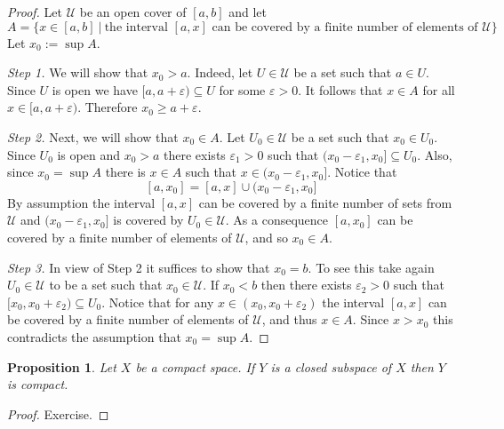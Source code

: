 \documentclass[11pt, letterpaper, oneside]{report}
\theoremstyle{pplain}
\newtheorem{proposition}[theorem]{Proposition}
\newtheorem{ITERMVALUE THM}[theorem]{Intermediate Value Theorem}
\newtheorem{HEINEBOREL THM}[theorem]{Heine-Borel Theorem}
\newtheorem{UMETR THM}[theorem]{Urysohn Metrization Theorem}
\newtheorem{UMETR2 THM}[theorem]{Urysohn Metrization Theorem (v.2)}
\theoremstyle{ddefinition}
\theoremstyle{nnn}
\newtheorem{TDA NN}[theorem]{Topological Data Analysis. }
\theoremstyle{eexercise}
\newcommand{\UU}{{\mathcal U}}
\newcommand{\ssmin}{\smallsetminus}
\begin{document}
\begin{proof}
Let $\UU$ be an open cover of $[a, b]$ and let 
$$A = \{x\in [a, b] \ | \  \text{the interval $[a, x]$ can be covered by a finite number of elements of $\UU$}\}$$
Let $x_{0} := \sup A$. 

\emph{Step 1.} We will show that $x_{0} > a$. Indeed, let $U\in \UU$ be a set such that $a\in U$. 
Since $U$ is open we have $[a, a+\varepsilon ) \subseteq U$ for some $\varepsilon > 0$. It follows 
that $x\in A$ for all $x\in [a, a+\varepsilon)$. Therefore $x_{0}\geq a+\varepsilon$. 


\emph{Step 2.} Next, we  will show  that $x_{0}\in A$. Let $U_{0}\in \UU$ be a set such that 
$x_{0}\in U_{0}$. Since $U_{0}$ is open and $x_{0}> a$ there exists $\varepsilon _{1} >0$ such that
$(x_{0}-\varepsilon_{1} , x_{0}] \subseteq U_{0}$. Also, since $x_{0} = \sup A$  there is $x\in A$
such that $x\in (x_{0}-\varepsilon_{1} , x_{0}]$. Notice that  
$$[a, x_{0}] = [a, x]\cup (x_{0}-\varepsilon_{1}, x_{0}]$$
By assumption the interval $[a, x]$ can be covered by a finite number of sets from  $\UU$ and 
$(x_{0}-\varepsilon_{1}, x_{0}]$ is covered by $U_{0}\in \UU$. As a consequence $[a, x_{0}]$
can be covered by a finite number of elements of $\UU$, and so $x_{0}\in A$. 

\emph{Step 3.} In view of Step 2 it suffices to show  that $x_{0} = b$.  To see this take again 
$U_{0}\in \UU$ to be a set such that $x_{0}\in \UU$. If $x_{0}< b$ then there exists $\varepsilon_{2} >0$
such that $[x_{0}, x_{0}+\varepsilon_{2} ) \subseteq U_{0}$. Notice that for any  
$x\in (x_{0}, x_{0}+\varepsilon_{2})$ the interval $[a, x]$ can be covered by a finite number of elements of 
$\UU$, and thus $x\in A$. Since $x> x_{0}$ this contradicts the assumption that $x_{0} = \sup A$.  

\end{proof}

\begin{proposition}
\label{CLOSED SUBSP OF COMPACT PROP}
Let $X$ be a compact space. If $Y$ is a closed subspace of $X$ then $Y$ is compact. 
\end{proposition}


\begin{proof}
Exercise.
\end{proof}
\end{document}
